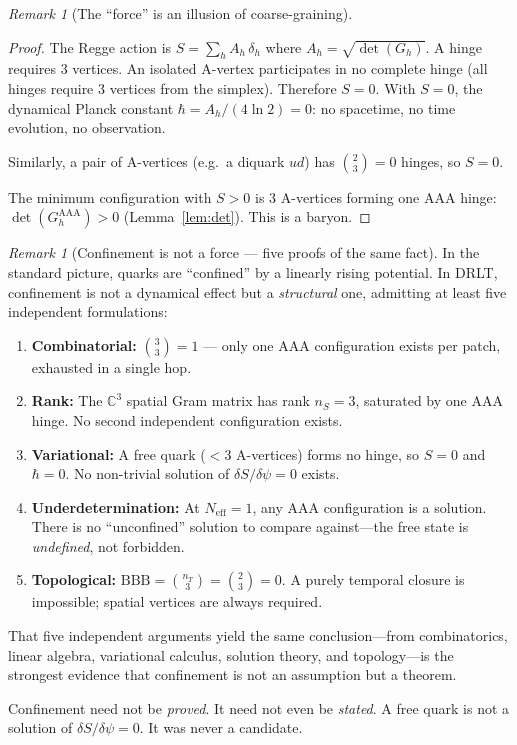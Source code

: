 \documentclass[12pt]{article}
\theoremstyle{remark}
\newtheorem{remark}[theorem]{Remark}
\theoremstyle{definition}
\newcommand{\CC}{\mathbb{C}}
\begin{document}
\begin{remark}[The ``force'' is an illusion of coarse-graining]
\begin{proof}
The Regge action is $S = \sum_h A_h\,\delta_h$ where $A_h = \sqrt{\det(G_h)}$.  A hinge requires 3 vertices.  An isolated A-vertex participates in no complete hinge (all hinges require 3 vertices from the simplex).  Therefore $S = 0$.  With $S = 0$, the dynamical Planck constant $\hbar = A_h/(4\ln 2) = 0$: no spacetime, no time evolution, no observation.

Similarly, a pair of A-vertices (e.g.\ a diquark $ud$) has $\binom{2}{3} = 0$ hinges, so $S = 0$.

The minimum configuration with $S > 0$ is 3 A-vertices forming one AAA hinge: $\det(G_h^{\mathrm{AAA}}) > 0$ (Lemma~\ref{lem:det}).  This is a baryon.
\end{proof}

\begin{remark}[Confinement is not a force --- five proofs of the same fact]
In the standard picture, quarks are ``confined'' by a linearly rising potential.  In DRLT, confinement is not a dynamical effect but a \emph{structural} one, admitting at least five independent formulations:
\begin{enumerate}
\item \textbf{Combinatorial:} $\binom{3}{3} = 1$ --- only one AAA configuration exists per patch, exhausted in a single hop.
\item \textbf{Rank:} The $\CC^3$ spatial Gram matrix has rank $n_S = 3$, saturated by one AAA hinge.  No second independent configuration exists.
\item \textbf{Variational:} A free quark ($< 3$ A-vertices) forms no hinge, so $S = 0$ and $\hbar = 0$.  No non-trivial solution of $\delta S/\delta\psi = 0$ exists.
\item \textbf{Underdetermination:} At $N_\text{eff} = 1$, any AAA configuration is a solution.  There is no ``unconfined'' solution to compare against---the free state is \emph{undefined}, not forbidden.
\item \textbf{Topological:} $\text{BBB} = \binom{n_T}{3} = \binom{2}{3} = 0$.  A purely temporal closure is impossible; spatial vertices are always required.
\end{enumerate}
That five independent arguments yield the same conclusion---from combinatorics, linear algebra, variational calculus, solution theory, and topology---is the strongest evidence that confinement is not an assumption but a theorem.

Confinement need not be \emph{proved}.  It need not even be \emph{stated}.  A free quark is not a solution of $\delta S/\delta\psi = 0$.  It was never a candidate.
\end{remark}


\end{remark}
\end{document}

